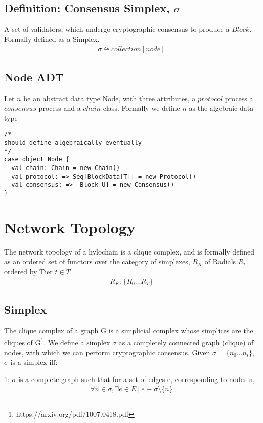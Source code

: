 \documentclass{article}
\begin{document}
\subsection{Definition: Consensus Simplex, $\sigma$}
A set of validators, which undergo cryptographic consensus to produce a $Block$. Formally defined as a Simplex.
\begin{equation} \label{eq1}
\begin{split}
\sigma \cong collection[node]
\end{split}
\end{equation}

\subsection{Node ADT}
Let $n$ be an abstract data type Node, with three attributes, a $protocol$ process a $consensus$ process and a $chain$ class. Formally we define $n$ as the algebraic data type
\begin{lstlisting}
/*
should define algebraically eventually
*/
case object Node {
  val chain: Chain = new Chain()
  val protocol: => Seq[BlockData[T]] = new Protocol()
  val consensus: =>  Block[U] = new Consensus()
}
\end{lstlisting}

\section{Network Topology}
The network topology of a hylochain is a clique complex, and is formally defined as an ordered set of functors over the category of simplexes, $R_K$ of Radials $R_t$ ordered by Tier $t \in T$
\begin{equation} \label{eq1}
\begin{split}
R_K: \{R_0 \dots R_T \}
\end{split}
\end{equation}

\subsection{Simplex}
The clique complex of a graph G is a simplicial complex whose simplices are the cliques of G\footnote{https://arxiv.org/pdf/1007.0418.pdf}. We define a simplex $\sigma$ as a completely connected graph (clique) of nodes, with which we can perform cryptographic consensus. Given $\sigma = \{n_0 \dots n_i\}$, $\sigma$ is a simplex iff:

1: $\sigma$ is a complete graph such that for a set of edges e, corresponding to nodes n,
\begin{equation} \label{eq1}
\begin{split}
\forall n \in \sigma, \exists e \in E \ | \ e \equiv \sigma \setminus \{n\} 
\end{split}
\end{equation}
\end{document}
